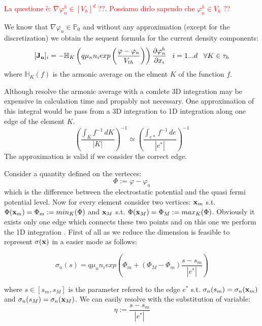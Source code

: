 \textcolor{red}{La questione \`e: $\nabla \varphi_n^h \in \left[ V_h \right]^d$ ??. Possiamo dirlo sapendo che $\varphi_n^h \in V_h$ ??}

We know that $\nabla \varphi_n \in \mathbb{P}_0$ and without any approximation (except for the discretization) we obtain the sequent formula for the current density components:
\begin{equation}
\label{eq: first formula for J}
[\vect{J_n}]_i = - \mathbb{H}_K \left( q \mu_n n_i exp \left( \dfrac{\varphi-\varphi_n}{V_{th}} \right)  \right) \dfrac{\partial \varphi_n^h}{\partial x_i} \psp{5} i = 1...d \psp{5} \forall K \in \tau_h
\end{equation}
where $\mathbb{H}_K(f)$ is the armonic average on the elment $K$ of the function $f$.

Although resolve the armonic average with a comlete 3D integration may be expensive in calculation time and propably not necessary. One approximation of this integral would be pass from a 3D integration to 1D integration along one edge of the element $K$.
\begin{equation}
\label{eq: approzimation from 3D to edge}
\left(\dfrac{\int_K f^{-1} \, dK}{|K|} \right)^{-1} \simeq \left(\dfrac{\int_{e*} f^{-1} \, de}{|e^*|} \right)^{-1}
\end{equation}
  The approximation  is valid if we consider the correct edge.


Consider a quantity defined on the verteces:
\begin{equation}
\label{eq: differenza tra pot e qf}
\Phi := \varphi - 	\varphi_n
\end{equation}
which is the difference between the electrostatic potential and the quasi fermi potential level. Now for every element consider two vertices: $\mathbf{x}_m$ s.t. $\Phi(\mathbf{x}_m)=\Phi_m := min_K(\Phi)$ and $\mathbf{x}_M$ s.t. $\Phi(\mathbf{x}_M)=\Phi_M:=max_K(\Phi)$. Obviously it exists only one edge which connects these two points and on this one we perform the 1D integration . First of all as we reduce the dimension is feasible to represent $\sigma(\mathbf{x})$ in a easier mode as follows:

\begin{equation}
\sigma_n(s) = q \mu_n n_i exp\left( \Phi_m + (\Phi_M-\Phi_m)\dfrac{s-s_m}{|e^*|} \right)
\end{equation}

where $s \in [s_m,s_M]$ is the parameter refered to the edge $e^*$ s.t. $\sigma_n(s_m)=\sigma_n(\mathbf{x}_m)$ and $\sigma_n(s_M)=\sigma_n(\mathbf{x}_M)$. We can easily resolve  with the substitution of variable:
\begin{equation*}
\eta := \dfrac{s-s_m}{|e^*|}
\end{equation*}

